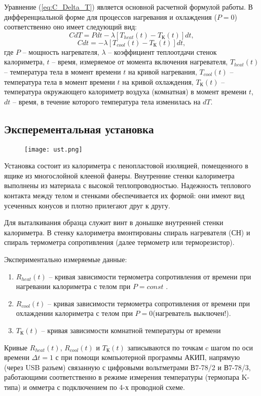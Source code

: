 Уравнение (\ref{eq:C_Delta_T}) является основной расчетной формулой работы. В дифференциальной форме для процессов нагревания и охлаждения ($P = 0$) соответственно оно имеет следующий вид:
\begin{equation}
    CdT = Pdt - \lambda\left[T_{heat}(t) - T_\text{К}(t)\right]dt,
    \label{eq:CdT}
\end{equation}
\begin{equation}
    Cdt = -\lambda\left[T_{cool}(t) - T_\text{К}(t)\right]dt,
    \label{eq:CdT2}
\end{equation}
где $P$ -- мощность нагревателя, $\lambda$ -- коэффициент теплоотдачи стенок
калориметра, $t$ – время, измеряемое от момента включения нагревателя,
$T_{heat}(t)$ -- температура тела в момент времени $t$ на кривой нагревания,
$T_{cool}(t)$ -- температура тела в момент времени $t$ на кривой охлаждения,
$T_\text{К}(t)$ -- температура окружающего калориметр воздуха (комнатная) в
момент времени $t$, $dt$ -- время, в течение которого температура тела
изменилась на $dT$.

\subsection{Эксперементальная установка}

\begin{figure}[h]
    \centering
    \texttt{[image: ust.png]}
\end{figure}

Установка состоит из калориметра с пенопластовой изоляцией,
помещенного в ящике из многослойной клееной фанеры. Внутренние стенки калориметра выполнены из материала с высокой
теплопроводностью. Надежность теплового контакта между телом и
стенками обеспечивается их формой: они имеют вид усеченных конусов
и плотно прилегают друг к другу.

Для выталкивания образца служит винт в донышке внутренней стенки
калориметра. В стенку калориметра вмонтированы спираль нагревателя
(СН) и спираль термометра сопротивления (далее термометр или
терморезистор).

Экспериментально измеряемые данные:
\begin{enumerate}
    \item $R_{heat}(t)$ -- кривая зависимости термометра сопротивления от времени при нагревании калориметра с телом при $P = const$ .
    \item $R_{cool}(t)$ -- кривая зависимости термометра сопротивления от времени при охлаждении калориметра с телом при $P = 0$(нагреватель выключен!).
    \item $T_\text{К}(t)$ -- кривая зависимости комнатной температуры от времени
\end{enumerate}
Кривые $R_{heat}(t)$, $R_{cool}(t)$ и $T_\text{К}(t)$ записываются по точкам c шагом по
оси времени $\Delta t = 1$ с при помощи компьютерной программы АКИП,
напрямую (через USB разъем) связанную с цифровыми вольтметрами
В7-78/2 и В7-78/3, работающими соответственно в режиме измерения
температуры (термопара K-типа) и омметра с подключением по 4-х
проводной схеме.

